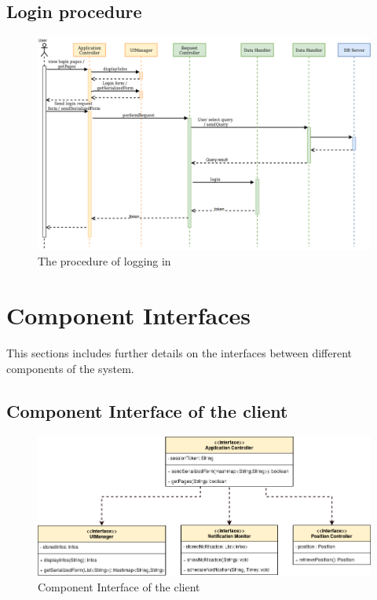 \documentclass[numbers=noenddot, 12pt, a4paper, oneside]{scrbook}
\begin{document}
\subsection*{Login procedure}

\begin{figure}[H]
	\centering
	\includegraphics[width=1\textwidth,angle=-0]{images/Login}
	\caption{The procedure of logging in}
\end{figure}

\section{Component Interfaces}

This sections includes further details on the interfaces between different components of the system.

\subsection*{Component Interface of the client}

\begin{figure}[H]
	\centering
	\includegraphics[width=1\textwidth]{images/ClientInterface}
	\caption{Component Interface of the client}
\end{figure}
\end{document}
